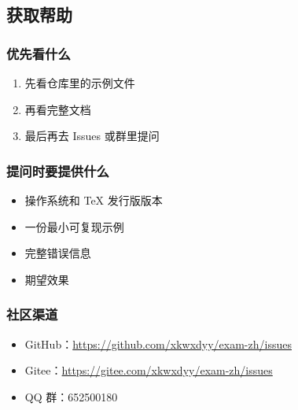 \subsection{获取帮助}

\subsubsection{优先看什么}

\begin{enumerate}
  \item 先看仓库里的示例文件
  \item 再看完整文档 
  \item 最后再去 Issues 或群里提问
\end{enumerate}

\subsubsection{提问时要提供什么}

\begin{itemize}
  \item 操作系统和 \TeX{} 发行版版本
  \item 一份最小可复现示例
  \item 完整错误信息
  \item 期望效果
\end{itemize}

\subsubsection{社区渠道}

\begin{itemize}
  \item GitHub：\url{https://github.com/xkwxdyy/exam-zh/issues}
  \item Gitee：\url{https://gitee.com/xkwxdyy/exam-zh/issues}
  \item QQ 群：652500180
\end{itemize}
